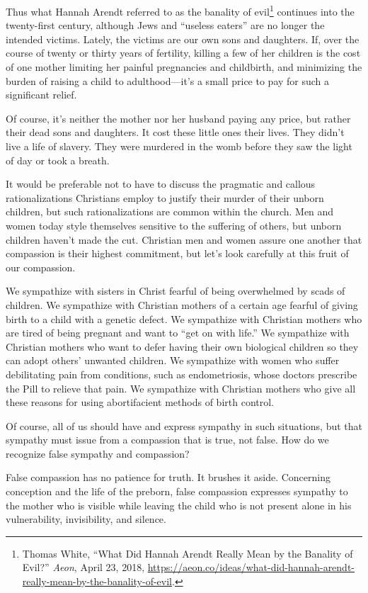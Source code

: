 \documentclass[
]{book}
\begin{document}
Thus what Hannah Arendt referred to as the banality of evil\footnote{Thomas White, ``What Did Hannah Arendt Really Mean by the Banality of Evil?'' \emph{Aeon}, April 23, 2018, \url{https://aeon.co/ideas/what-did-hannah-arendt-really-mean-by-the-banality-of-evil}.} continues into the twenty-first century, although Jews and ``useless eaters'' are no longer the intended victims. Lately, the victims are our own sons and daughters. If, over the course of twenty or thirty years of fertility, killing a few of her children is the cost of one mother limiting her painful pregnancies and childbirth, and minimizing the burden of raising a child to adulthood---it's a small price to pay for such a significant relief.

Of course, it's neither the mother nor her husband paying any price, but rather their dead sons and daughters. It cost these little ones their lives. They didn't live a life of slavery. They were murdered in the womb before they saw the light of day or took a breath.

It would be preferable not to have to discuss the pragmatic and callous rationalizations Christians employ to justify their murder of their unborn children, but such rationalizations are common within the church. Men and women today style themselves sensitive to the suffering of others, but unborn children haven't made the cut. Christian men and women assure one another that compassion is their highest commitment, but let's look carefully at this fruit of our compassion.

We sympathize with sisters in Christ fearful of being overwhelmed by scads of children. We sympathize with Christian mothers of a certain age fearful of giving birth to a child with a genetic defect. We sympathize with Christian mothers who are tired of being pregnant and want to ``get on with life.'' We sympathize with Christian mothers who want to defer having their own biological children so they can adopt others' unwanted children. We sympathize with women who suffer debilitating pain from conditions, such as endometriosis, whose doctors prescribe the Pill to relieve that pain. We sympathize with Christian mothers who give all these reasons for using abortifacient methods of birth control.

Of course, all of us should have and express sympathy in such situations, but that sympathy must issue from a compassion that is true, not false. How do we recognize false sympathy and compassion?

False compassion has no patience for truth. It brushes it aside. Concerning conception and the life of the preborn, false compassion expresses sympathy to the mother who is visible while leaving the child who is not present alone in his vulnerability, invisibility, and silence.
\end{document}
